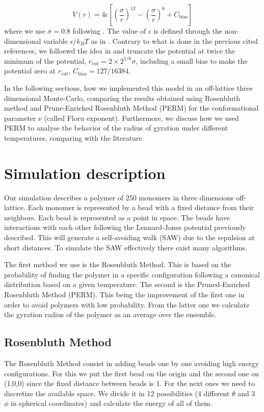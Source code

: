 \documentclass[aps,prl,reprint,groupedaddress]{revtex4-1}
\begin{document}
\begin{equation}
	V(r) = 4 \epsilon \left[\left(\frac{\sigma}{r} \right)^{12} - \left(\frac{\sigma}{r} \right)^{6} + C_{\text{bias}}\right]
\end{equation}
where we use $\sigma = 0.8$ following \cite{Yong1996, ICCPBook}. The value of $\epsilon$ is defined through the non-dimensional variable $\epsilon/k_B T$ as in \cite{Grassberger1997, Yong1996}. Contrary to what is done in the previous cited references, we folloewd the idea in \cite{mc_polymer_review} and truncate the potential at twice the minimum of the potential, $r_{\text{cut}} = 2 \times 2^{1/6} \sigma$, including a small bias to make the potential zero at $r_{\text{cut}}$, $C_{\text{bias}} = 127/16384$.

In the following sections, how we implemented this model in an off-lattice three dimensional Monte-Carlo, comparing the results obtained using Rosenbluth method and Prune-Enriched Rosenbluth Method (PERM) for the conformational parameter $\nu$ (called Floru exponent). Furthermore, we discuss how we used PERM to analyse the behavior of the radius of gyration under different temperatures, comparing with the literature.

\section{Simulation description \label{description}}
Our simulation describes a polymer of 250 monomers in three dimensions off-lattice. Each monomer is represented by a bead with a fixed distance from their neighbors. Each bead is represented as a point in space. The beads have interactions with each other following the Lennard-Jones potential previously described. This will generate a self-avoiding walk (SAW) due to the repulsion at short distances. To simulate the SAW effectively there exist many algorithms. 

The first method we use is the Rosenbluth Method. This is based on the probability of finding the polymer in a specific configuration following a canonical distribution based on a given temperature.  The second is the Pruned-Enriched Rosenbluth Method (PERM). This being the improvement of the first one in order to avoid polymers with low probability. From the latter one we calculate the gyration radius of the polymer as an average over the ensemble.

\subsection{Rosenbluth Method}
The Rosenbluth Method consist in adding beads one by one avoiding high energy configurations. For this we put the first bead on the origin and the second one on (1,0,0) since the fixed distance between beads is 1. For the next ones we need to discretize the available space. We divide it in 12 possibilities (4 different $\theta$ and 3 $\phi$ in spherical coordinates) and calculate the energy of all of them. 
\end{document}
